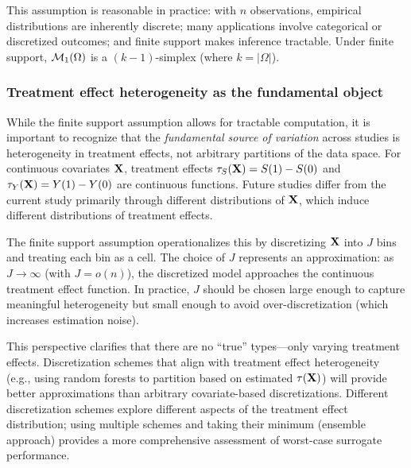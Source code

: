 \documentclass{article}
\begin{document}
This assumption is reasonable in practice: with $n$ observations, empirical distributions are inherently discrete; many applications involve categorical or discretized outcomes; and finite support makes inference tractable. Under finite support, $\mathcal{M}_1(\Omega)$ is a $(k-1)$-simplex (where $k = |\Omega|$).

\subsubsection{Treatment effect heterogeneity as the fundamental object}

While the finite support assumption allows for tractable computation, it is important to recognize that the \emph{fundamental source of variation} across studies is heterogeneity in treatment effects, not arbitrary partitions of the data space. For continuous covariates $\mathbf{X}$, treatment effects $\tau_S(\mathbf{X}) = S(1) - S(0)$ and $\tau_Y(\mathbf{X}) = Y(1) - Y(0)$ are continuous functions. Future studies differ from the current study primarily through different distributions of $\mathbf{X}$, which induce different distributions of treatment effects.

The finite support assumption operationalizes this by discretizing $\mathbf{X}$ into $J$ bins and treating each bin as a cell. The choice of $J$ represents an approximation: as $J \to \infty$ (with $J = o(n)$), the discretized model approaches the continuous treatment effect function. In practice, $J$ should be chosen large enough to capture meaningful heterogeneity but small enough to avoid over-discretization (which increases estimation noise).

This perspective clarifies that there are no ``true'' types---only varying treatment effects. Discretization schemes that align with treatment effect heterogeneity (e.g., using random forests to partition based on estimated $\tau(\mathbf{X})$) will provide better approximations than arbitrary covariate-based discretizations. Different discretization schemes explore different aspects of the treatment effect distribution; using multiple schemes and taking their minimum (ensemble approach) provides a more comprehensive assessment of worst-case surrogate performance.
\end{document}
